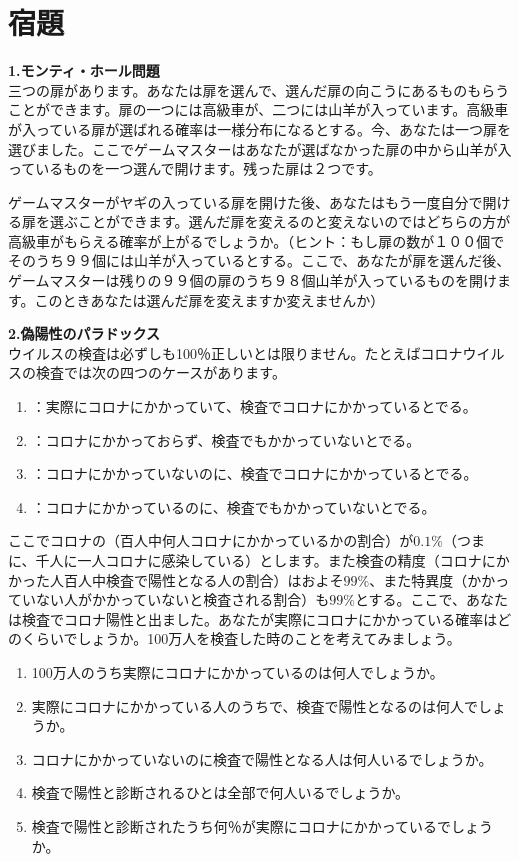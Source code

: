 \documentclass{ltjsarticle}
\begin{document}
\section{宿題}
\par\textbf{1.モンティ・ホール問題}\\
三つの扉があります。あなたは扉を選んで、選んだ扉の向こうにあるものもらうことができます。扉の一つには高級車が、二つには山羊が入っています。高級車が入っている扉が選ばれる確率は一様分布になるとする。今、あなたは一つ扉を選びました。ここでゲームマスターはあなたが選ばなかった扉の中から山羊が入っているものを一つ選んで開けます。残った扉は２つです。
\par ゲームマスターがヤギの入っている扉を開けた後、あなたはもう一度自分で開ける扉を選ぶことができます。選んだ扉を変えるのと変えないのではどちらの方が高級車がもらえる確率が上がるでしょうか。（ヒント：もし扉の数が１００個でそのうち９９個には山羊が入っているとする。ここで、あなたが扉を選んだ後、ゲームマスターは残りの９９個の扉のうち９８個山羊が入っているものを開けます。このときあなたは選んだ扉を変えますか変えませんか）
\par\textbf{2.偽陽性のパラドックス}\\
ウイルスの検査は必ずしも100％正しいとは限りません。たとえばコロナウイルスの検査では次の四つのケースがあります。
\begin{enumerate}
\item {}：実際にコロナにかかっていて、検査でコロナにかかっているとでる。
\item {}：コロナにかかっておらず、検査でもかかっていないとでる。
\item {}：コロナにかかっていないのに、検査でコロナにかかっているとでる。
\item {}：コロナにかかっているのに、検査でもかかっていないとでる。
\end{enumerate}
ここでコロナの（百人中何人コロナにかかっているかの割合）が$0.1\%$（つまに、千人に一人コロナに感染している）とします。また検査の精度（コロナにかかった人百人中検査で陽性となる人の割合）はおよそ$99\%$、また特異度（かかっていない人がかかっていないと検査される割合）も$99\%$とする。ここで、あなたは検査でコロナ陽性と出ました。あなたが実際にコロナにかかっている確率はどのくらいでしょうか。100万人を検査した時のことを考えてみましょう。
\begin{enumerate}[ステップ1.]
\item 100万人のうち実際にコロナにかかっているのは何人でしょうか。
\item 実際にコロナにかかっている人のうちで、検査で陽性となるのは何人でしょうか。
\item コロナにかかっていないのに検査で陽性となる人は何人いるでしょうか。
\item 検査で陽性と診断されるひとは全部で何人いるでしょうか。
\item 検査で陽性と診断されたうち何％が実際にコロナにかかっているでしょうか。
\end{enumerate}
\end{document}
